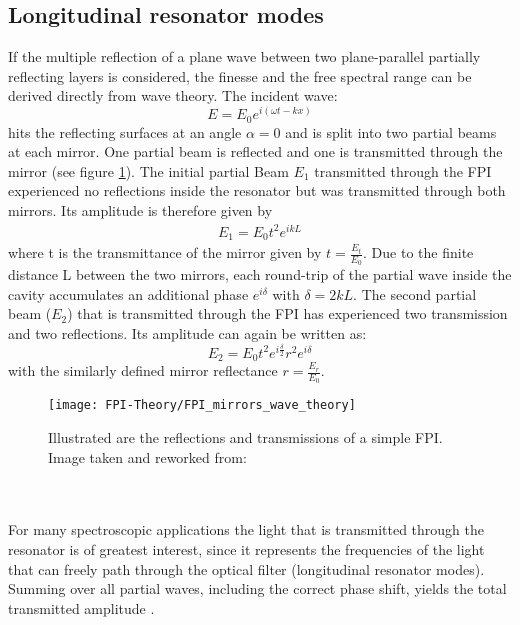 \subsection{Longitudinal resonator modes}
If the multiple reflection of a plane wave between two plane-parallel partially reflecting layers is considered, the finesse and the free spectral range can be derived directly from wave theory. The incident wave: 
\begin{equation}
	E=E_0 e^{i(\omega t - kx)}
	\label{wave_eqaution_FPI}
\end{equation}
hits the reflecting surfaces at an angle $\alpha =0$ and is split into two partial beams at each mirror. One partial beam is reflected and one is transmitted through the mirror (see figure \ref{figure:FPI-wave_theory}).  The initial partial Beam $E_1$ transmitted through the FPI experienced no reflections inside the resonator but was transmitted through both mirrors. Its amplitude is therefore given by 
\begin{align*}
	E_1= E_0 t^2 e^{ikL} 
\end{align*}
where t is the transmittance of the mirror given by $t=\frac{E_t}{E_0}$. Due to the finite distance L between the two mirrors, each round-trip of the partial wave inside the cavity accumulates an additional phase $e^{i\delta} $ with $\delta = 2kL$. The second partial beam ($E_2$) that is transmitted through the FPI has experienced two transmission and two reflections. Its amplitude can again be written as: 
\begin{equation*}
	E_2= E_0 t^2e^{i\frac{\delta}{2}} r^2 e^{i\delta}
\end{equation*}
with the similarly defined mirror reflectance $r=\frac{E_r}{E_0}$. 
\begin{figure}[ht]
	\centering
	\texttt{[image: FPI-Theory/FPI\_mirrors\_wave\_theory]}
	\caption{Illustrated are the reflections and transmissions of a simple FPI. Image taken and reworked from: \cite{Lauterborn2003}}
	\label{figure:FPI-wave_theory}
\end{figure}
\\ \\ \noindent
For many spectroscopic applications the light that is transmitted through the resonator is of greatest interest, since it represents the frequencies of the light that can freely path through the optical filter (longitudinal resonator modes). Summing over all partial waves, including the correct phase shift, yields the total transmitted amplitude \cite{DemtroederLaser2011}\cite{Lauterborn2003}.
